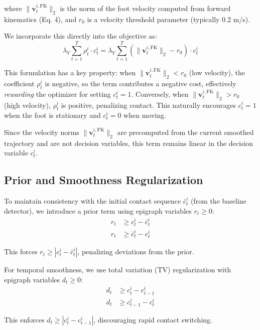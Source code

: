 \documentclass[conference]{IEEEtran}
\begin{document}
where $\|\mathbf{v}_t^{i,\text{FK}}\|_2$ is the norm of the foot velocity computed from forward kinematics (Eq. 4),
and $r_0$ is a velocity threshold parameter (typically 0.2 m/s).

We incorporate this directly into the objective as:
\begin{equation}
\lambda_V \sum_{t=1}^{T} \rho_t^i \cdot c_t^i = \lambda_V \sum_{t=1}^{T} (\|\mathbf{v}_t^{i,\text{FK}}\|_2 - r_0) \cdot c_t^i
\end{equation}

This formulation has a key property: when $\|\mathbf{v}_t^{i,\text{FK}}\|_2 < r_0$ (low velocity), the coefficient
$\rho_t^i$ is negative, so the term contributes a negative cost, effectively \emph{rewarding} the optimizer for
setting $c_t^i = 1$. Conversely, when $\|\mathbf{v}_t^{i,\text{FK}}\|_2 > r_0$ (high velocity), $\rho_t^i$ is positive,
penalizing contact. This naturally encourages $c_t^i = 1$ when the foot is stationary and $c_t^i = 0$ when moving.

Since the velocity norms $\|\mathbf{v}_t^{i,\text{FK}}\|_2$ are precomputed from the current smoothed trajectory
and are not decision variables, this term remains linear in the decision variable $c_t^i$.

\subsection{Prior and Smoothness Regularization}
To maintain consistency with the initial contact sequence $\bar{c}_t^i$ (from the baseline detector), we introduce a prior term using epigraph variables $r_t \geq 0$:
\begin{align}
r_t &\geq c_t^i - \bar{c}_t^i \\
r_t &\geq \bar{c}_t^i - c_t^i
\end{align}

This forces $r_t \geq |c_t^i - \bar{c}_t^i|$, penalizing deviations from the prior.

For temporal smoothness, we use total variation (TV) regularization with epigraph variables $d_t \geq 0$:
\begin{align}
d_t &\geq c_t^i - c_{t-1}^i \\
d_t &\geq c_{t-1}^i - c_t^i
\end{align}

This enforces $d_t \geq |c_t^i - c_{t-1}^i|$, discouraging rapid contact switching.
\\
\\
\\
\end{document}
